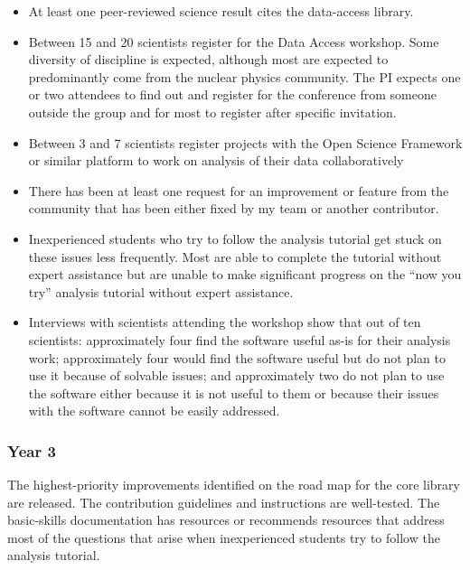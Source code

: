 \begin{itemize}
  \item At least one peer-reviewed science result cites the data-access library.
  \item Between 15 and 20 scientists register for the Data Access workshop.  Some diversity of discipline is expected, although most are expected to predominantly come from the nuclear physics community.  The PI expects one or two attendees to find out and register for the conference from someone outside the group and for most to register after specific invitation.
  \item Between 3 and 7 scientists register projects with the Open Science Framework or similar platform to work on analysis of their data collaboratively
  \item  There has been at least one request for an improvement or feature from the community that has been either fixed by my team or another contributor.
  \item  Inexperienced students who try to follow the analysis tutorial get stuck on these issues less frequently.  Most are able to complete the tutorial without expert assistance but are unable to make significant progress on the ``now you try'' analysis tutorial without expert assistance.
  \item Interviews with scientists attending the workshop show that out of ten scientists: approximately four find the software useful as-is for their analysis work; approximately four would find the software useful but do not plan to use it because of solvable issues; and approximately two do not plan to use the software either because it is not useful to them or because their issues with the software cannot be easily addressed.
\end{itemize}

\subsubsection*{Year 3}
The highest-priority improvements identified on the road map for the core library are released.  The contribution guidelines and instructions are well-tested.  The basic-skills documentation has resources or recommends resources that address most of the questions that arise when inexperienced students try to follow the analysis tutorial.  

